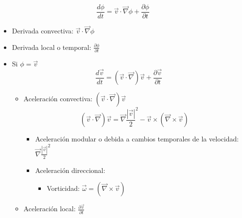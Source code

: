 \[\frac{d\phi}{dt}=\vec{v} \cdot\vec{\nabla}\phi +\frac{\partial \phi}{\partial t} \]
\begin{itemize}
	\item Derivada convectiva: $\vec{v} \cdot\vec{\nabla}\phi$
	\item Derivada local o temporal: $\frac{\partial \phi}{\partial t}$
	\item Si $\phi = \vec{v}$
	\[\frac{d\vec{v}}{dt}=(\vec{v} \cdot\vec{\nabla})\vec{v}+\frac{\partial \vec v}{\partial t} \]
	\begin{itemize}
		\item Aceleración convectiva: $(\vec{v} \cdot\vec{\nabla})\vec{v}$
		\[(\vec{v} \cdot\vec{\nabla})\vec{v}=\vec{\nabla}\frac{|\vec{v}|}{2}^2-\vec{v} \times \left(\vec{\nabla}\times\vec{v}\right)\]
		\begin{itemize}
			\item Aceleración modular o debida a cambios temporales de la velocidad: $\vec{\nabla}\frac{|\vec{v}|}{2}^2$
			\item Aceleración direccional: 
			\begin{itemize}
				\item Vorticidad: $\vec{\omega}= \left(\vec{\nabla}\times\vec{v}\right)$
			\end{itemize}
		\end{itemize}
		\item Aceleración local: $\frac{\partial \vec v}{\partial t}$
	\end{itemize}
\end{itemize}
